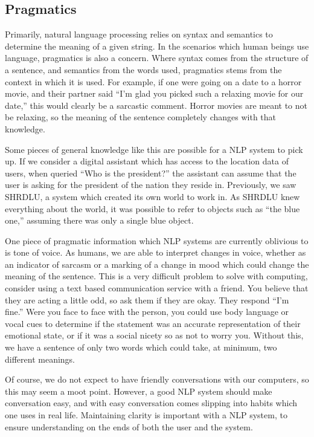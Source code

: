 \subsection{Pragmatics}
Primarily, natural language processing relies on syntax and semantics to determine the meaning of a given string. In the scenarios which human beings use language, pragmatics is also a concern. Where syntax comes from the structure of a sentence, and semantics from the words used, pragmatics stems from the context in which it is used. For example, if one were going on a date to a horror movie, and their partner said ``I'm glad you picked such a relaxing movie for our date,'' this would clearly be a sarcastic comment. Horror movies are meant to not be relaxing, so the meaning of the sentence completely changes with that knowledge.

Some pieces of general knowledge like this are possible for a NLP system to pick up. If we consider a digital assistant which has access to the location data of users, when queried ``Who is the president?'' the assistant can assume that the user is asking for the president of the nation they reside in. Previously, we saw SHRDLU, a system which created its own world to work in. As SHRDLU knew everything about the world, it was possible to refer to objects such as ``the blue one,'' assuming there was only a single blue object.

One piece of pragmatic information which NLP systems are currently oblivious to is tone of voice. As humans, we are able to interpret changes in voice, whether as an indicator of sarcasm or a marking of a change in mood which could change the meaning of the sentence. This is a very difficult problem to solve with computing, consider using a text based communication service with a friend. You believe that they are acting a little odd, so ask them if they are okay. They respond ``I'm fine.'' Were you face to face with the person, you could use body language or vocal cues to determine if the statement was an accurate representation of their emotional state, or if it was a social nicety so as not to worry you. Without this, we have a sentence of only two words which could take, at minimum, two different meanings.

Of course, we do not expect to have friendly conversations with our computers, so this may seem a moot point. However, a good NLP system should make conversation easy, and with easy conversation comes slipping into habits which one uses in real life. Maintaining clarity is important with a NLP system, to ensure understanding on the ends of both the user and the system.


